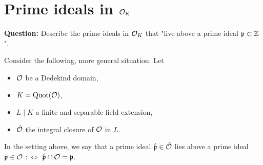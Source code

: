 
\section{Prime ideals in $\mathcal{O}_K$}

\textbf{Question:} Describe the prime ideals in $\mathcal{O}_K$ that "live above a prime  ideal $\mathfrak{p} \subset \mathbb{Z}$".

Consider the following, more general situation:
Let
\begin{itemize}
	\item $\mathcal{O}$ be a Dedekind domain,
	\item $K = \operatorname{Quot}(\mathcal{O})$,
	\item $L \mid K$ a finite and separable field extension,
	\item $\hat{\mathcal{O}}$ the integral closure of $\mathcal{O}$ in $L$.
\end{itemize}

\begin{defi}
	In the setting above, we say that a prime ideal $\hat{\mathfrak{p}} \in \hat{\mathcal{O}}$ lies above a prime ideal $\mathfrak{p} \in \mathcal{O}$ $:\Leftrightarrow$ $\hat{\mathfrak{p}} \cap \mathcal{O} = \mathfrak{p}$.
\end{defi}

